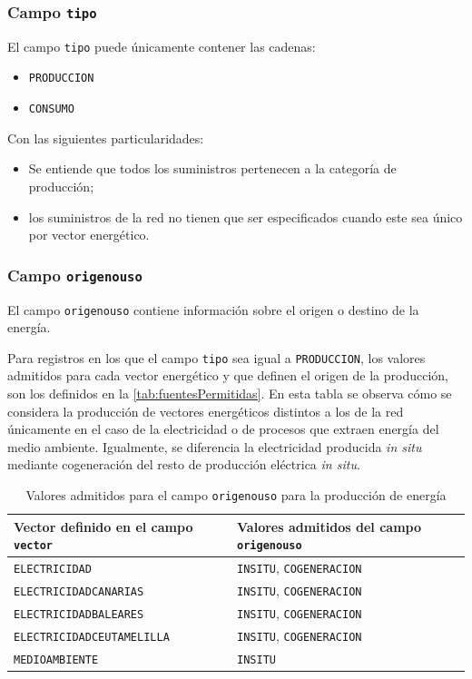 \documentclass[10pt,notitlepage,oneside,a4paper]{article}
\begin{document}
\subsubsection{Campo \texttt{tipo}}

El campo \texttt{tipo} puede únicamente contener las cadenas:

\begin{itemize}
\item \texttt{PRODUCCION}
\item \texttt{CONSUMO}
\end{itemize}

Con las siguientes particularidades:

\begin{itemize}
\item Se entiende que todos los suministros pertenecen a la categoría de producción;
\item los suministros de la red no tienen que ser especificados cuando este sea único por vector energético.
\end{itemize}

\subsubsection{Campo \texttt{origenouso}}

El campo \texttt{origenouso} contiene información sobre el origen o destino de la energía.

Para registros en los que el campo \texttt{tipo} sea igual a \texttt{PRODUCCION}, los valores admitidos para cada vector energético y que definen el origen de la producción, son los definidos en la \autoref{tab:fuentesPermitidas}. En esta tabla se observa cómo se considera la producción de vectores energéticos distintos a los de la red únicamente en el caso de la electricidad o de procesos que extraen energía del medio ambiente. Igualmente, se diferencia la electricidad producida \textit{in situ} mediante cogeneración del resto de producción eléctrica \textit{in situ}.

\begin{table}[H]
\centering
\small
\caption{Valores admitidos para el campo \texttt{origenouso} para la producción de energía}\label{tab:fuentesPermitidas}
\begin{tabular}{ll}
    \toprule
    \textbf{Vector definido en el campo \texttt{vector}} & \textbf{Valores admitidos del campo \texttt{origenouso}}\\
    \midrule
    \texttt{ELECTRICIDAD}             & \texttt{INSITU}, \texttt{COGENERACION}\\
    \texttt{ELECTRICIDADCANARIAS}     & \texttt{INSITU}, \texttt{COGENERACION}\\
    \texttt{ELECTRICIDADBALEARES}     & \texttt{INSITU}, \texttt{COGENERACION}\\
    \texttt{ELECTRICIDADCEUTAMELILLA} & \texttt{INSITU}, \texttt{COGENERACION}\\
    \texttt{MEDIOAMBIENTE}            & \texttt{INSITU}\\
    \bottomrule
\end{tabular}
\end{table}
\end{document}

